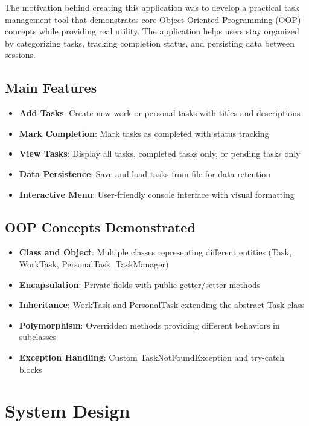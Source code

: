 \documentclass[12pt,a4paper]{article}
\begin{document}
The motivation behind creating this application was to develop a practical task management tool that demonstrates core Object-Oriented Programming (OOP) concepts while providing real utility. The application helps users stay organized by categorizing tasks, tracking completion status, and persisting data between sessions.

\subsection{Main Features}

\begin{itemize}
    \item \textbf{Add Tasks}: Create new work or personal tasks with titles and descriptions
    \item \textbf{Mark Completion}: Mark tasks as completed with status tracking
    \item \textbf{View Tasks}: Display all tasks, completed tasks only, or pending tasks only
    \item \textbf{Data Persistence}: Save and load tasks from file for data retention
    \item \textbf{Interactive Menu}: User-friendly console interface with visual formatting
\end{itemize}

\subsection{OOP Concepts Demonstrated}

\begin{itemize}
    \item \textbf{Class and Object}: Multiple classes representing different entities (Task, WorkTask, PersonalTask, TaskManager)
    \item \textbf{Encapsulation}: Private fields with public getter/setter methods
    \item \textbf{Inheritance}: WorkTask and PersonalTask extending the abstract Task class
    \item \textbf{Polymorphism}: Overridden methods providing different behaviors in subclasses
    \item \textbf{Exception Handling}: Custom TaskNotFoundException and try-catch blocks
\end{itemize}
\newpage
\section{System Design}
\end{document}
